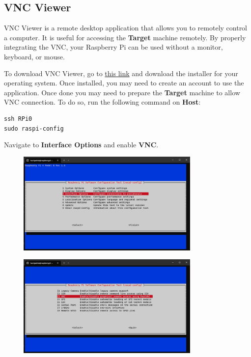 \subsection{VNC Viewer}

VNC Viewer is a remote desktop application that allows you to remotely control a computer. It is useful for accessing the \textbf{Target} machine remotely. By properly integrating the VNC, your Raspberry Pi can be used without a monitor, keyboard, or mouse.

To download VNC Viewer, go to \href{https://www.realvnc.com/en/connect/download/viewer/}{this link} and download the installer for your operating system. Once installed, you may need to create an account to use the application. Once done you may need to prepare the \textbf{Target} machine to allow VNC connection. To do so, run the following command on \textbf{Host}:

\begin{lstlisting}
ssh RPi0
sudo raspi-config
\end{lstlisting}

Navigate to \textbf{Interface Options} and enable \textbf{VNC}.

\begin{figure}[H]
      \centering
      \includegraphics[width=0.8\textwidth]{texs/chapter1/image/vnc1.png}
\end{figure}

\begin{figure}[H]
      \centering
      \includegraphics[width=0.8\textwidth]{texs/chapter1/image/vnc2.png}
\end{figure}

